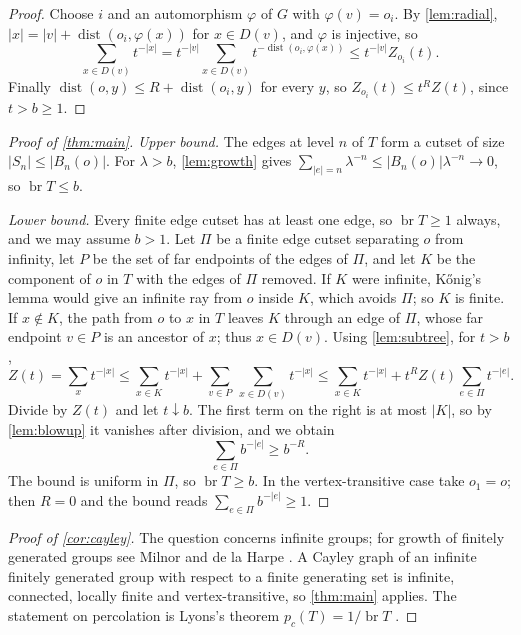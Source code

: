 \documentclass[11pt]{amsart}
\newtheorem{lemma}[theorem]{Lemma}
\theoremstyle{remark}
\DeclareMathOperator{\br}{br}
\DeclareMathOperator{\dist}{dist}
\begin{document}

\begin{proof}
Choose $i$ and an automorphism $\varphi$ of $G$ with $\varphi(v)=o_i$. By \cref{lem:radial}, $|x|=|v|+\dist(o_i,\varphi(x))$ for $x\in D(v)$, and $\varphi$ is injective, so
\[
\sum_{x\in D(v)}t^{-|x|}=t^{-|v|}\sum_{x\in D(v)}t^{-\dist(o_i,\varphi(x))}\le t^{-|v|}Z_{o_i}(t).
\]
Finally $\dist(o,y)\le R+\dist(o_i,y)$ for every $y$, so $Z_{o_i}(t)\le t^{R}Z(t)$, since $t>b\ge1$.
\end{proof}

\begin{proof}[Proof of \cref{thm:main}]
\emph{Upper bound.} The edges at level $n$ of $T$ form a cutset of size $|S_n|\le|B_n(o)|$. For $\lambda>b$, \cref{lem:growth} gives $\sum_{|e|=n}\lambda^{-n}\le|B_n(o)|\lambda^{-n}\to0$, so $\br T\le b$.

\emph{Lower bound.} Every finite edge cutset has at least one edge, so $\br T\ge1$ always, and we may assume $b>1$. Let $\Pi$ be a finite edge cutset separating $o$ from infinity, let $P$ be the set of far endpoints of the edges of $\Pi$, and let $K$ be the component of $o$ in $T$ with the edges of $\Pi$ removed. If $K$ were infinite, K\H{o}nig's lemma would give an infinite ray from $o$ inside $K$, which avoids $\Pi$; so $K$ is finite. If $x\notin K$, the path from $o$ to $x$ in $T$ leaves $K$ through an edge of $\Pi$, whose far endpoint $v\in P$ is an ancestor of $x$; thus $x\in D(v)$. Using \cref{lem:subtree}, for $t>b$,
\[
Z(t)=\sum_{x}t^{-|x|}\le\sum_{x\in K}t^{-|x|}+\sum_{v\in P}\ \sum_{x\in D(v)}t^{-|x|}\le\sum_{x\in K}t^{-|x|}+t^{R}Z(t)\sum_{e\in\Pi}t^{-|e|}.
\]
Divide by $Z(t)$ and let $t\downarrow b$. The first term on the right is at most $|K|$, so by \cref{lem:blowup} it vanishes after division, and we obtain
\[
\sum_{e\in\Pi}b^{-|e|}\ge b^{-R}.
\]
The bound is uniform in $\Pi$, so $\br T\ge b$. In the vertex-transitive case take $o_1=o$; then $R=0$ and the bound reads $\sum_{e\in\Pi}b^{-|e|}\ge1$.
\end{proof}

\begin{proof}[Proof of \cref{cor:cayley}]
The question concerns infinite groups; for growth of finitely generated groups see Milnor \cite{Milnor1968} and de la Harpe \cite{dlH}. A Cayley graph of an infinite finitely generated group with respect to a finite generating set is infinite, connected, locally finite and vertex-transitive, so \cref{thm:main} applies. The statement on percolation is Lyons's theorem $p_c(T)=1/\br T$ \cite{Lyons1990}.
\end{proof}
\end{document}
